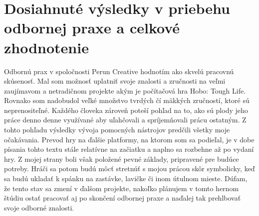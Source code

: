 \documentclass[slovak, bachelorpractice]{diploma}
\begin{document}
\section{Dosiahnuté výsledky v priebehu odbornej praxe a celkové zhodnotenie}
\label{sec:Results}
Odbornú prax v spoločnosti Perun Creative hodnotím ako skvelú pracovnú skúsenosť. Mal som možnosť uplatniť svoje znalosti a zručnosti na veľmi zaujímavom a netradičnom projekte akým je počítačová hra Hobo: Tough Life. Rovnako som nadobudol veľké množstvo tvrdých čí mäkkých zručností, ktoré sú neprenositeľné. Každého človeka zároveň poteší pohľad na to, ako sú plody jeho práce denno denne využívané aby uľahčovali a spríjemňovali prácu ostatným. Z tohto pohľadu výsledky vývoja pomocných nástrojov predčili všetky moje očakávania. Prevod hry na ďalšie platformy, na ktorom som sa podieľal, je v dobe písania tohto textu stále relatívne na začiatku a naplno sa rozbehne až po vydaní hry. Z mojej strany boli však položené pevné základy, pripravené pre budúce potreby. 
Hráči sa potom budú môcť stretnúť s mojou prácou skôr symbolicky, keď sa budú ukladať k spánku na zastávke, lavičke či inom útulnom mieste. Dúfam, že tento stav sa zmení v ďalšom projekte, nakoľko plánujem v tomto hernom štúdiu ostať pracovať aj po skončení odbornej praxe a naďalej tak prehlbovať svoje odborné znalosti.

\printbibliography[title={Literatúra}, heading=bibintoc]
\end{document}
